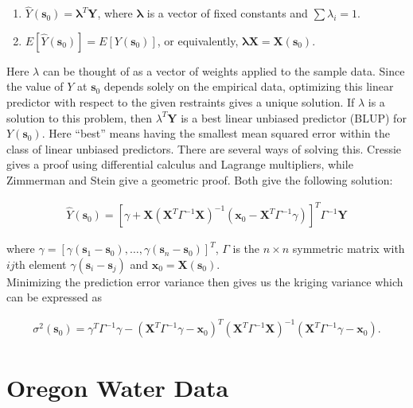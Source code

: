 \documentclass[12pt,twoside]{reedthesis}
\begin{document}
\begin{enumerate}
\item $\hat Y(\mathbf{s}_0) = \mathbf{\lambda}^T\mathbf{Y}$, where $\mathbf{\lambda}$ is a vector of fixed constants and $\sum \lambda_i = 1$. 
\item $E[\hat Y(\mathbf{s}_0)] = E[Y(\mathbf{s}_0)]$, or equivalently, $\mathbf{\lambda}\mathbf{X} = \mathbf{X}(\mathbf{s}_0)$.
\end{enumerate}

Here $\lambda$ can be thought of as a vector of weights applied to the sample data. Since the value of $Y$ at $\mathbf{s}_0$ depends solely on the empirical data, optimizing this linear predictor with respect to the given restraints gives a unique solution. If $\lambda$ is a solution to this problem, then $\lambda^T\mathbf{Y}$ is a best linear unbiased predictor (BLUP) for $Y(\mathbf{s}_0)$. Here ``best'' means having the smallest mean squared error within the class of linear unbiased predictors. There are several ways of solving this. Cressie \cite{cressie:1993} gives a proof using differential calculus and Lagrange multipliers, while Zimmerman and Stein \cite{gelfand:2010} give a geometric proof. Both give the following solution:

\begin{align*}
\hat Y(\mathbf{s}_0) = [\gamma + \mathbf{X}(\mathbf{X}^T\Gamma^{-1}\mathbf{X})^{-1}(\mathbf{x}_0 - \mathbf{X}^T\Gamma^{-1}\gamma)]^T\Gamma^{-1}\mathbf{Y}
\end{align*}

where $\gamma = [\gamma(\mathbf{s}_1 - \mathbf{s}_0), \dots, \gamma(\mathbf{s}_n - \mathbf{s}_0)]^T$, $\Gamma$ is the $n \times n$ symmetric matrix with $ij$th element $\gamma(\mathbf{s}_i - \mathbf{s}_j)$ and $\mathbf{x}_0 = \mathbf{X}(\mathbf{s}_0)$. \\

Minimizing the prediction error variance then gives us the kriging variance which can be expressed as

\begin{align*}
\sigma^2(\mathbf{s}_0) = \gamma^T\Gamma^{-1}\gamma - (\mathbf{X}^T\Gamma^{-1}\gamma - \mathbf{x}_0)^T(\mathbf{X}^T\Gamma^{-1}\mathbf{X})^{-1}(\mathbf{X}^T\Gamma^{-1}\gamma - \mathbf{x}_0).
\end{align*}



\chapter{Oregon Water Data}
\end{document}
